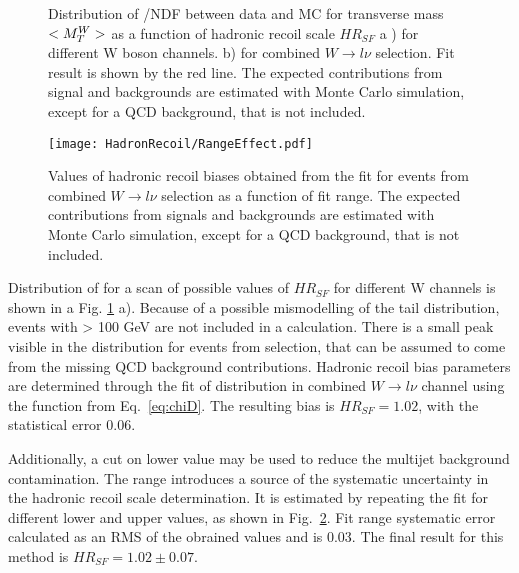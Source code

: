 \begin{figure}[!tbp]
\begin{minipage}[h]{0.49\linewidth}
\end{minipage}
\hfill
\begin{minipage}[h]{0.49\linewidth}
\end{minipage}
\caption{Distribution of \chiD/NDF  between data and MC for transverse mass  $<M_T^W>$ as a function of hadronic recoil scale $HR_{SF}$ a ) for different W boson channels. 
b) for combined $W \to l \nu$ selection. Fit result is shown by the red line. The expected contributions from signal and backgrounds are estimated with Monte Carlo simulation, except for a QCD background, that is not included.}
\label{mtWChi2}
\end{figure}

\begin{figure}[!tbp]
\centering
\texttt{[image: HadronRecoil/RangeEffect.pdf]}
\caption{Values of hadronic recoil biases obtained from the fit for events from combined $W \to l \nu$ selection as a function of fit range. The expected contributions from signals and backgrounds are estimated with Monte Carlo simulation, except for a QCD background, that is not included.}
\label{ScaleMtWRange}
\end{figure}

Distribution of \chiD  for a scan of possible values of $HR_{SF}$ for different W channels is shown in a Fig. \ref{mtWChi2} a). Because of a possible mismodelling of the tail \mtw distribution, events with \mtw > 100 GeV are not included in a \chiD calculation. There is a small peak visible in the \chiD distribution for events from \wenu selection, that can be assumed to come from the missing QCD background contributions. Hadronic recoil bias parameters are determined through the fit of \chiD distribution in combined $W\to l\nu$ channel using the function from Eq.~\ref{eq:chiD}. The resulting bias is $HR_{SF}=1.02$, with the statistical error 0.06. 

Additionally, a cut on \mtw lower value may be used to reduce the multijet background contamination. The \mtw range introduces a source of the systematic uncertainty in the hadronic recoil scale determination. It is estimated by repeating the fit for  different \mtw lower and upper values, as shown in Fig.~\ref{ScaleMtWRange}. Fit range systematic error calculated as an RMS of the obrained values and is 0.03. The final result for this method is $HR_{SF}=1.02\pm0.07$. 


